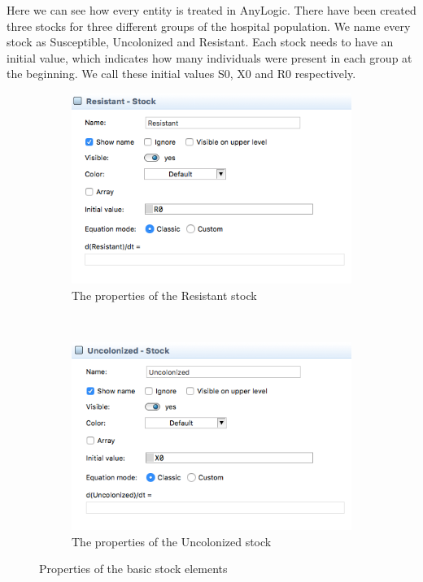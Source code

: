 Here we can see how every entity is treated in AnyLogic. There have been created three stocks for three different groups of the hospital population. We name every stock as Susceptible, Uncolonized and Resistant. Each stock needs to have an initial value, which indicates how many individuals were present in each group at the beginning. We call these initial values S0, X0 and R0 respectively.

\begin{figure}[!ht]
    \centering
    \begin{subfigure}[b]{0.48\textwidth}
        \includegraphics[width=\textwidth]{img/screens/basic/basic1}
        \caption{The properties of the Resistant stock}
    \end{subfigure}
    ~ %
    \begin{subfigure}[b]{0.48\textwidth}
        \includegraphics[width=\textwidth]{img/screens/basic/basic2}
        \caption{The properties of the Uncolonized stock}
    \end{subfigure}
    \caption{Properties of the basic stock elements}
\end{figure}

